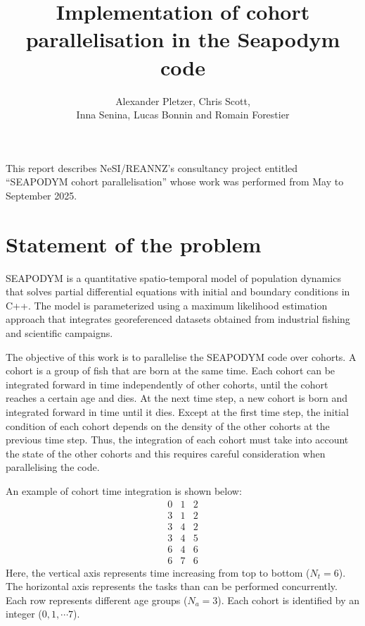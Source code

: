 \documentclass[a4paper,oneside,12pt]{article}
\begin{document}
\author{Alexander Pletzer, Chris Scott, \\
Inna Senina, Lucas Bonnin and Romain Forestier}
\title{Implementation of cohort parallelisation in the Seapodym code}

\maketitle


\pagestyle{plain}

This report describes NeSI/REANNZ's consultancy project entitled ``SEAPODYM cohort parallelisation'' whose work was performed from May to September 2025.

\section{Statement of the problem}

SEAPODYM is a quantitative spatio-temporal model
of population dynamics that solves partial differential
equations with initial and boundary conditions in C++. 
The model is parameterized using a maximum
likelihood estimation approach that integrates georeferenced 
datasets obtained from industrial fishing and scientific campaigns.

The objective of this work is to parallelise the SEAPODYM code over cohorts. 
A cohort is a group of fish that are born at the same time. Each cohort 
can be integrated forward in time independently of other cohorts, until the cohort reaches a certain age and dies. 
At the next time step, a new cohort is born and integrated forward in time until it dies. Except 
at the first time step, the initial condition of each cohort depends on 
the density of the other cohorts at the previous time step. Thus, the integration of 
each cohort must take into account the state of the other cohorts and this requires 
careful consideration when parallelising the code.

An example of cohort time integration is shown below:
\begin{equation} \label{eq:cohorts}
\begin{array}{ccc}
0 & 1 & 2 \\
3 & 1 & 2 \\
3 & 4 & 2 \\
3 & 4 & 5 \\
6 & 4 & 6 \\
6 & 7 & 6
\end{array}
\end{equation}
Here, the vertical axis represents time increasing from top to bottom ($N_t = 6$). The horizontal axis represents the 
tasks than can be performed concurrently. Each row represents different age groups ($N_a = 3$). 
Each cohort is identified by an integer ($0, 1, \cdots 7$). 
\end{document}
